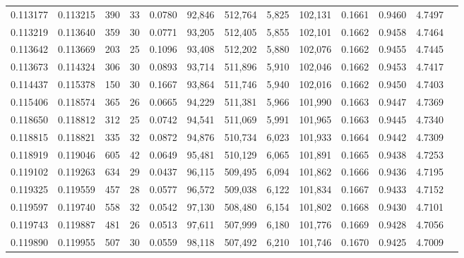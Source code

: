 \begin{tabular}{rrrrrrrrrrrrr}
0.113177 & 0.113215 &   390 &  33 &                                     0.0780 &  92,846 & 512,764 &   5,825 & 102,131 & 0.1661 & 0.9460 & 4.7497 \\
0.113219 & 0.113640 &   359 &  30 &                                     0.0771 &  93,205 & 512,405 &   5,855 & 102,101 & 0.1662 & 0.9458 & 4.7464 \\
0.113642 & 0.113669 &   203 &  25 &                                     0.1096 &  93,408 & 512,202 &   5,880 & 102,076 & 0.1662 & 0.9455 & 4.7445 \\
0.113673 & 0.114324 &   306 &  30 &                                     0.0893 &  93,714 & 511,896 &   5,910 & 102,046 & 0.1662 & 0.9453 & 4.7417 \\
0.114437 & 0.115378 &   150 &  30 &                                     0.1667 &  93,864 & 511,746 &   5,940 & 102,016 & 0.1662 & 0.9450 & 4.7403 \\
0.115406 & 0.118574 &   365 &  26 &                                     0.0665 &  94,229 & 511,381 &   5,966 & 101,990 & 0.1663 & 0.9447 & 4.7369 \\
0.118650 & 0.118812 &   312 &  25 &                                     0.0742 &  94,541 & 511,069 &   5,991 & 101,965 & 0.1663 & 0.9445 & 4.7340 \\
0.118815 & 0.118821 &   335 &  32 &                                     0.0872 &  94,876 & 510,734 &   6,023 & 101,933 & 0.1664 & 0.9442 & 4.7309 \\
0.118919 & 0.119046 &   605 &  42 &                                     0.0649 &  95,481 & 510,129 &   6,065 & 101,891 & 0.1665 & 0.9438 & 4.7253 \\
0.119102 & 0.119263 &   634 &  29 &                                     0.0437 &  96,115 & 509,495 &   6,094 & 101,862 & 0.1666 & 0.9436 & 4.7195 \\
0.119325 & 0.119559 &   457 &  28 &                                     0.0577 &  96,572 & 509,038 &   6,122 & 101,834 & 0.1667 & 0.9433 & 4.7152 \\
0.119597 & 0.119740 &   558 &  32 &                                     0.0542 &  97,130 & 508,480 &   6,154 & 101,802 & 0.1668 & 0.9430 & 4.7101 \\
0.119743 & 0.119887 &   481 &  26 &                                     0.0513 &  97,611 & 507,999 &   6,180 & 101,776 & 0.1669 & 0.9428 & 4.7056 \\
0.119890 & 0.119955 &   507 &  30 &                                     0.0559 &  98,118 & 507,492 &   6,210 & 101,746 & 0.1670 & 0.9425 & 4.7009 \\

\end{tabular}
